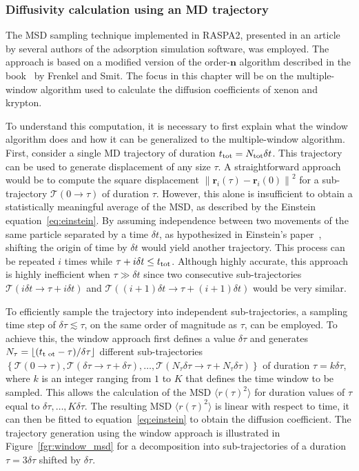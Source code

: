 \documentclass[main]{subfiles}
\begin{document}
\subsubsection{Diffusivity calculation using an MD trajectory}

The MSD sampling technique implemented in RASPA2\autocite{dubbeldam2016}, presented in an article~\cite{Dubbeldam_2009} by several authors of the adsorption simulation software, was employed. The approach is based on a modified version of the order-$\mathbf{n}$ algorithm described in the book~\cite{frenkel2001msd} by Frenkel and Smit. The focus in this chapter will be on the multiple-window algorithm used to calculate the diffusion coefficients of xenon and krypton.

To understand this computation, it is necessary to first explain what the window algorithm does and how it can be generalized to the multiple-window algorithm. First, consider a single MD trajectory of duration $t_{\text{tot}}=N_{\text{tot}}\delta t$. This trajectory can be used to generate displacement of any size $\tau$. A straightforward approach would be to compute the square displacement ${\lVert\mathbf{r}_i(\tau)-\mathbf{r}_i(0)\rVert}^2$ for a sub-trajectory $\mathcal{T}(0\rightarrow\tau)$ of duration $\tau$. However, this alone is insufficient to obtain a statistically meaningful average of the MSD, as described by the Einstein equation~\ref{eq:einstein}. By assuming independence between two movements of the same particle separated by a time $\delta t$, as hypothesized in Einstein's paper~\cite{einstein1905motion}, shifting the origin of time by $\delta t$ would yield another trajectory. This process can be repeated $i$ times while $\tau + i\delta t\leq t_{\text{tot}}$. Although highly accurate, this approach is highly inefficient when $\tau \gg \delta t$ since two consecutive sub-trajectories $\mathcal{T}(i\delta t\rightarrow\tau+i\delta t)$ and $\mathcal{T}((i+1)\delta t\rightarrow\tau+(i+1)\delta t)$ would be very similar. 

To efficiently sample the trajectory into independent sub-trajectories, a sampling time step of $\delta \tau\lesssim\tau$, on the same order of magnitude as $\tau$, can be employed. To achieve this, the window approach first defines a value $\delta \tau$ and generates $N_{\tau} = \lfloor(t_{\text{t ot}} -\tau)/ \delta\tau \rfloor$ different sub-trajectories $\left\{\mathcal{T}(0\rightarrow\tau), \mathcal{T}(\delta\tau\rightarrow\tau + \delta\tau), \ldots, \mathcal{T}(N_{\tau}\delta\tau\rightarrow\tau + N_{\tau}\delta\tau)\right\}$ of duration $\tau=k\delta\tau$, where $k$ is an integer ranging from $1$ to $K$ that defines the time window to be sampled. This allows the calculation of the MSD $\langle {r(\tau)}^2 \rangle$ for duration values of $\tau$ equal to $\delta\tau, \ldots, K\delta\tau$. The resulting MSD $\langle {r(\tau)}^2 \rangle$ is linear with respect to time, it can then be fitted to equation~\ref{eq:einstein} to obtain the diffusion coefficient. The trajectory generation using the window approach is illustrated in Figure~\ref{fgr:window_msd} for a decomposition into sub-trajectories of a duration $\tau=3\delta\tau$ shifted by $\delta\tau$.
\end{document}
